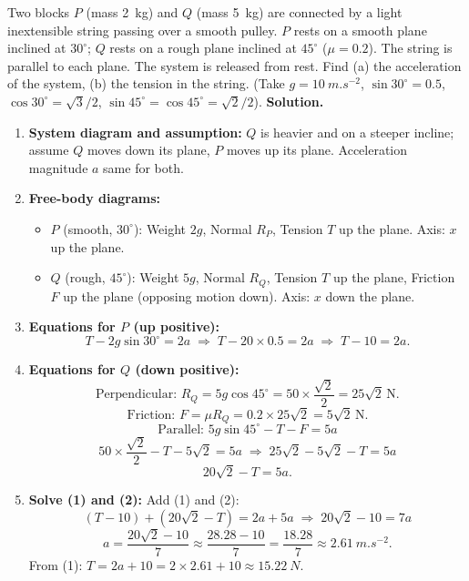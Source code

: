 \documentclass[11pt]{article}
\begin{document}
\begin{exoresolu}
Two blocks $P$ (mass \SI{2}{kg}) and $Q$ (mass \SI{5}{kg}) are connected by a light inextensible string passing over a smooth pulley. $P$ rests on a smooth plane inclined at $30^\circ$; $Q$ rests on a rough plane inclined at $45^\circ$ ($\mu = 0.2$). The string is parallel to each plane. The system is released from rest. Find (a) the acceleration of the system, (b) the tension in the string. (Take $g = \SI{10}{m.s^{-2}}$, $\sin 30^\circ=0.5$, $\cos 30^\circ=\sqrt{3}/2$, $\sin 45^\circ=\cos 45^\circ=\sqrt{2}/2$).
\tcblower
\textbf{Solution.}
\begin{enumerate}
    \item \textbf{System diagram and assumption:} $Q$ is heavier and on a steeper incline; assume $Q$ moves down its plane, $P$ moves up its plane. Acceleration magnitude $a$ same for both.
    \item \textbf{Free-body diagrams:}
    \begin{itemize}
        \item $P$ (smooth, $30^\circ$): Weight $2g$, Normal $R_P$, Tension $T$ up the plane. Axis: $x$ up the plane.
        \item $Q$ (rough, $45^\circ$): Weight $5g$, Normal $R_Q$, Tension $T$ up the plane, Friction $F$ up the plane (opposing motion down). Axis: $x$ down the plane.
    \end{itemize}
    \item \textbf{Equations for $P$ (up positive):}
    \[
    T - 2g\sin 30^\circ = 2a \;\Longrightarrow\; T - 20 \times 0.5 = 2a \;\Longrightarrow\; T - 10 = 2a. \tag{1}
    \]
    \item \textbf{Equations for $Q$ (down positive):}
    \[
    \text{Perpendicular: } R_Q = 5g\cos 45^\circ = 50 \times \frac{\sqrt{2}}{2} = 25\sqrt{2}\,\mathrm{N}.
    \]
    \[
    \text{Friction: } F = \mu R_Q = 0.2 \times 25\sqrt{2} = 5\sqrt{2}\,\mathrm{N}.
    \]
    \[
    \text{Parallel: } 5g\sin 45^\circ - T - F = 5a
    \]
    \[
    50 \times \frac{\sqrt{2}}{2} - T - 5\sqrt{2} = 5a \;\Longrightarrow\; 25\sqrt{2} - 5\sqrt{2} - T = 5a
    \]
    \[
    20\sqrt{2} - T = 5a. \tag{2}
    \]
    \item \textbf{Solve (1) and (2):} Add (1) and (2):
    \[
    (T - 10) + (20\sqrt{2} - T) = 2a + 5a \;\Longrightarrow\; 20\sqrt{2} - 10 = 7a
    \]
    \[
    a = \frac{20\sqrt{2} - 10}{7} \approx \frac{28.28 - 10}{7} = \frac{18.28}{7} \approx \SI{2.61}{m.s^{-2}}.
    \]
    From (1): $T = 2a + 10 = 2 \times 2.61 + 10 \approx \SI{15.22}{N}$.

\end{enumerate}
\end{exoresolu}
\end{document}
